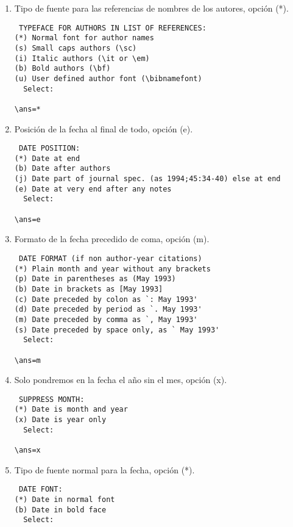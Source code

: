 \begin{enumerate}
\begin{verbatim}
\end{verbatim}

\item Tipo de fuente para las referencias de nombres de los autores, opción (*).

\begin{verbatim}
 TYPEFACE FOR AUTHORS IN LIST OF REFERENCES:
(*) Normal font for author names 
(s) Small caps authors (\sc)
(i) Italic authors (\it or \em)
(b) Bold authors (\bf)
(u) User defined author font (\bibnamefont)
  Select:

\ans=*
\end{verbatim}

\item Posición de la fecha al final de todo, opción (e).

\begin{verbatim}
 DATE POSITION:
(*) Date at end 
(b) Date after authors 
(j) Date part of journal spec. (as 1994;45:34-40) else at end
(e) Date at very end after any notes
  Select:

\ans=e
\end{verbatim}

\item Formato de la fecha precedido de coma, opción (m).

\begin{verbatim}
 DATE FORMAT (if non author-year citations)
(*) Plain month and year without any brackets
(p) Date in parentheses as (May 1993)
(b) Date in brackets as [May 1993]
(c) Date preceded by colon as `: May 1993'
(d) Date preceded by period as `. May 1993'
(m) Date preceded by comma as `, May 1993'
(s) Date preceded by space only, as ` May 1993'
  Select:

\ans=m

\end{verbatim}

\item Solo pondremos en la fecha el año sin el mes, opción (x).

\begin{verbatim}
 SUPPRESS MONTH:
(*) Date is month and year 
(x) Date is year only 
  Select:

\ans=x
\end{verbatim}

\item Tipo de fuente normal para la fecha,  opción (*).

\begin{verbatim}
 DATE FONT:
(*) Date in normal font 
(b) Date in bold face 
  Select:


\end{verbatim}
\end{enumerate}
